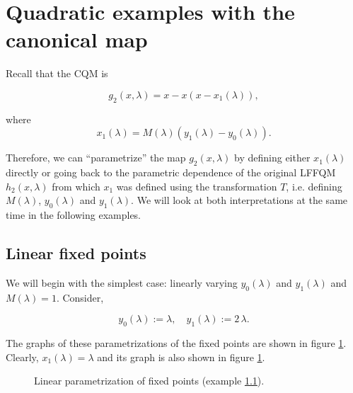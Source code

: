 \documentclass[10pt,twoside,titlepage]{book}
\numberwithin{equation}{chapter}
\numberwithin{figure}{chapter}
\numberwithin{table}{chapter}
\theoremstyle{plain}%
\theoremstyle{definition}
\theoremstyle{remark}
\begin{document}
\section{Quadratic examples with the canonical map}

Recall that the CQM is

\[g_2(x,\lambda)=x-x\left(x-x_1(\lambda)\right),\]

where
\begin{equation}
	\label{eq:CQM-x1def}
	x_1(\lambda)=M(\lambda)\left(y_1(\lambda)-y_0(\lambda)\right).
\end{equation}

Therefore, we can ``parametrize'' the map $g_2(x,\lambda)$ by defining either $x_1(\lambda)$ directly or going back to the parametric dependence of the original LFFQM $h_2(x,\lambda)$ from which $x_1$ was defined using the transformation $T$, i.e. defining $M(\lambda)$, $y_0(\lambda)$ and $y_1(\lambda)$. We will look at both interpretations at the same time in the following examples.

\subsection{Linear fixed points}
\label{ex:linearfps-CQM}

We will begin with the simplest case: linearly varying $y_0(\lambda)$ and $y_1(\lambda)$ and $M(\lambda)=1$. Consider,

\[y_0(\lambda):=\lambda, \quad y_1(\lambda):=2\,\lambda.\]

The graphs of these parametrizations of the fixed points are shown in figure \ref{fig:liny0liny1}. Clearly, $x_1(\lambda)=\lambda$ and its graph is also shown in figure \ref{fig:liny0liny1}.

\begin{figure}
	\centering
	\caption{Linear parametrization of fixed points (example \ref{ex:linearfps-CQM}).}
	\label{fig:liny0liny1}
\end{figure}
\end{document}
